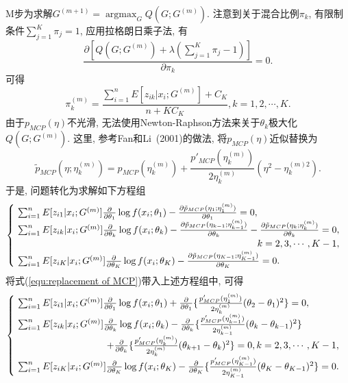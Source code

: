 \documentclass[a4paper,12pt,openany,oneside,utf-8]{ctexbook}
\begin{document}
M步为求解$G^{(m+1)}=\mathop{\arg\max}_{G} Q(G;G^{(m)})$. 注意到关于混合比例$\pi_k$, 有限制条件$\sum_{j=1}^{K} \pi_j =1$, 应用拉格朗日乘子法, 有
\begin{equation*}
  \frac{\partial [Q(G;G^{(m)})+\lambda(\sum_{j=1}^{K}\pi_j-1)]}{\partial \pi_{k}} =0.
\end{equation*}
可得
\begin{equation*}
  \pi_k^{(m)} = \frac{\sum_{i=1}^{n} E[z_{ik}|x_i;G^{(m)}] + C_{K}}{n + K C_{K}}, k=1, 2, \cdots, K.
\end{equation*}
由于$p_{MCP}(\eta)$不光滑, 无法使用Newton-Raphson方法来关于$\theta_k$极大化$Q(G;G^{(m)})$. 这里, 参考Fan和Li~(2001)的做法, 将$p_{MCP}(\eta)$近似替换为
\begin{equation}
\label{equ:replacement of MCP}
  \tilde{p}_{MCP}(\eta;\eta_k^{(m)}) = p_{MCP}(\eta_k^{(m)})+\frac{p'_{MCP}(\eta_k^{(m)})}{2\eta_k^{(m)}}
  (\eta^2-\eta_k^{(m)2}).
\end{equation}
于是, 问题转化为求解如下方程组
\[
\begin{cases}
 \ \sum_{i=1}^{n} E[z_{i1}|x_i;G^{(m)}] \frac{\partial}{\partial \theta_1} \log f(x_i; \theta_{1})
   - \frac{\partial \tilde{p}_{MCP}(\eta_1;\eta_1^{(m)})}{\partial \theta_1}=0, \\
 \ \sum_{i=1}^{n} E[z_{ik}|x_i;G^{(m)}] \frac{\partial}{\partial \theta_k} \log f(x_i; \theta_{k})
   - \frac{\partial \tilde{p}_{MCP}(\eta_{k-1};\eta_{k-1}^{(m)})}{\partial \theta_k}
   - \frac{\partial \tilde{p}_{MCP}(\eta_{k};\eta_{k}^{(m)})}{\partial \theta_k} =0, \\
   \ \hfill k=2, 3, \cdots, K-1, \\
 \ \sum_{i=1}^{n} E[z_{iK}|x_i;G^{(m)}] \frac{\partial}{\partial \theta_K} \log f(x_i; \theta_{K})
   - \frac{\partial \tilde{p}_{MCP}(\eta_{K-1};\eta_{K-1}^{(m)})}{\partial \theta_K}=0.
\end{cases}
\]
将式(\ref{equ:replacement of MCP})带入上述方程组中, 可得
\[
\begin{cases}
 \ \sum_{i=1}^{n} E[z_{i1}|x_i;G^{(m)}] \frac{\partial}{\partial \theta_1} \log f(x_i; \theta_{1})
   + \frac{\partial}{\partial \theta_1} \{ \frac{p'_{MCP}(\eta_1^{(m)})}{2\eta_k^{(m)}}(\theta_{2}-\theta_{1})^2 \} =0, \\
 \ \sum_{i=1}^{n} E[z_{ik}|x_i;G^{(m)}] \frac{\partial}{\partial \theta_k} \log f(x_i; \theta_{k})
   - \frac{\partial}{\partial \theta_k} \{ \frac{p'_{MCP}(\eta_{k-1}^{(m)})}{2\eta_{k-1}^{(m)}}(\theta_{k}-\theta_{k-1})^2 \} \\
   \ \hfill + \frac{\partial}{\partial \theta_k} \{ \frac{p'_{MCP}(\eta_{k}^{(m)})}{2\eta_{k}^{(m)}}(\theta_{k+1}-\theta_{k})^2 \} =0, k=2, 3, \cdots, K-1, \\
 \ \sum_{i=1}^{n} E[z_{iK}|x_i;G^{(m)}] \frac{\partial}{\partial \theta_K} \log f(x_i; \theta_{K})
   - \frac{\partial}{\partial \theta_K} \{ \frac{p'_{MCP}(\eta_{K-1}^{(m)})}{2\eta_{K-1}^{(m)}}(\theta_{K}-\theta_{K-1})^2 \}=0.
\end{cases}
\]
\end{document}
